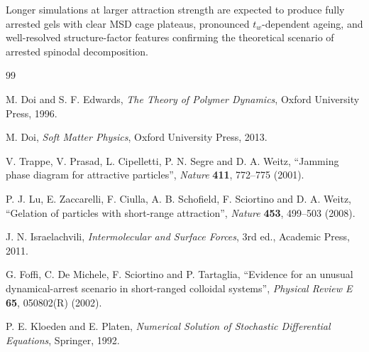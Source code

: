 \documentclass[11pt,a4paper]{article}
\begin{document}
Longer simulations at larger attraction strength are expected to produce fully arrested gels with clear MSD cage plateaus, pronounced $t_w$-dependent ageing, and well-resolved structure-factor features confirming the theoretical scenario of arrested spinodal decomposition.

\begin{thebibliography}{99}

M. Doi and S. F. Edwards, \textit{The Theory of Polymer Dynamics}, Oxford University Press, 1996.

M. Doi, \textit{Soft Matter Physics}, Oxford University Press, 2013.

V. Trappe, V. Prasad, L. Cipelletti, P. N. Segre and D. A. Weitz, ``Jamming phase diagram for attractive particles'', \textit{Nature} \textbf{411}, 772--775 (2001).

P. J. Lu, E. Zaccarelli, F. Ciulla, A. B. Schofield, F. Sciortino and D. A. Weitz, ``Gelation of particles with short-range attraction'', \textit{Nature} \textbf{453}, 499--503 (2008).

J. N. Israelachvili, \textit{Intermolecular and Surface Forces}, 3rd ed., Academic Press, 2011.

G. Foffi, C. De Michele, F. Sciortino and P. Tartaglia, ``Evidence for an unusual dynamical-arrest scenario in short-ranged colloidal systems'', \textit{Physical Review E} \textbf{65}, 050802(R) (2002).

P. E. Kloeden and E. Platen, \textit{Numerical Solution of Stochastic Differential Equations}, Springer, 1992.

\end{thebibliography}
\end{document}
